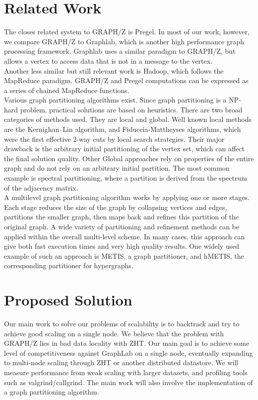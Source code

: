 \documentclass[10pt]{article}
\begin{document}
\begin{multicols}{2}
  \section{Related Work}
  The closes related system to GRAPH/Z is Pregel. In most of our work, however, we compare GRAPH/Z to Graphlab, which is another high performance graph processing framework. Graphlab uses a similar paradigm to GRAPH/Z, but allows a vertex to access data that is not in a message to the vertex.\cite{Gz:4} \\
  Another less similar but still relevant work is Hadoop, which follows the MapReduce paradigm. GRAPH/Z and Pregel computations can be expressed as a series of chained MapReduce functions.\cite{Gz:4}\\
  Various graph partitioning algorithms exist. Since graph partitioning is a NP-hard problem, practical solutions are based on heuristics. There are two broad categories of methods used. They are local and global. Well known local methods are the Kernighan–Lin algorithm, and Fiduccia-Mattheyses algorithms, which were the first effective 2-way cuts by local search strategies. Their major drawback is the arbitrary initial partitioning of the vertex set, which can affect the final solution quality. Other Global approaches rely on properties of the entire graph and do not rely on an arbitrary initial partition. The most common example is spectral partitioning, where a partition is derived from the spectrum of the adjacency matrix.\\
  A multilevel graph partitioning algorithm works by applying one or more stages. Each stage reduces the size of the graph by collapsing vertices and edges, partitions the smaller graph, then maps back and refines this partition of the original graph. A wide variety of partitioning and refinement methods can be applied within the overall multi-level scheme. In many cases, this approach can give both fast execution times and very high quality results. One widely used example of such an approach is METIS, a graph partitioner, and hMETIS, the corresponding partitioner for hypergraphs.
  
  \section{Proposed Solution}
  Our main work to solve our problems of scalability is to backtrack and try to achieve good scaling on a single node. We believe that the problem with GRAPH/Z lies in bad data locality with ZHT. Our main goal is to achieve some level of competitiveness against GraphLab on a single node, eventually expanding to multi-node scaling through ZHT or another distributed datastore. We will measure performance from weak scaling with larger datasets, and profiling tools such as valgrind/callgrind. The main work will also involve the implementation of a graph partitioning algorithm.
  

\end{multicols}
\end{document}

